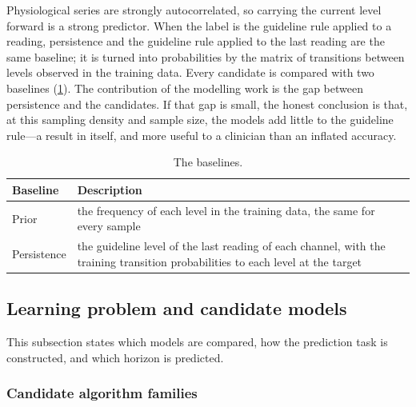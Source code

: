 Physiological series are strongly autocorrelated, so carrying the current level forward is a strong predictor. When the label is the guideline rule applied to a reading, persistence and the guideline rule applied to the last reading are the same baseline; it is turned into probabilities by the matrix of transitions between levels observed in the training data. Every candidate is compared with two baselines (\cref{tab:baselines}). The contribution of the modelling work is the gap between persistence and the candidates. If that gap is small, the honest conclusion is that, at this sampling density and sample size, the models add little to the guideline rule---a result in itself, and more useful to a clinician than an inflated accuracy.

\begin{table}[htbp]
\centering\small
\caption{The baselines.}\label{tab:baselines}
\begin{tabularx}{\textwidth}{@{}>{\raggedright\arraybackslash}p{3.2cm} X@{}}
\toprule
\textbf{Baseline} & \textbf{Description} \\
\midrule
Prior & the frequency of each level in the training data, the same for every sample \\
Persistence & the guideline level of the last reading of each channel, with the training transition probabilities to each level at the target \\
\bottomrule
\end{tabularx}
\end{table}


\subsection{Learning problem and candidate models}\label{sec:ml}\label{sec:learning}

This subsection states which models are compared, how the prediction task is constructed, and which horizon is predicted.

\subsubsection{Candidate algorithm families}\label{sec:families}

